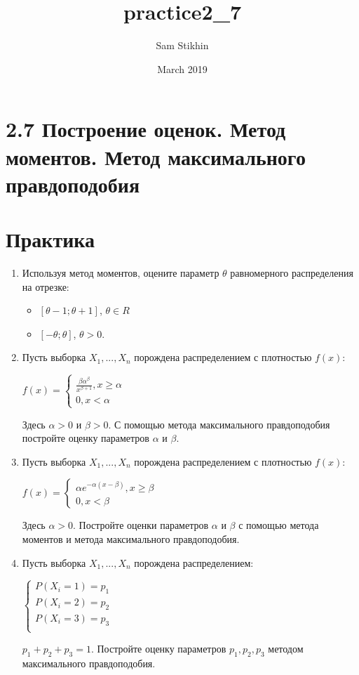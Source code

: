 \documentclass[a4paper, 14pt]{extarticle}
\title{practice2_7}
\author{Sam Stikhin}
\date{March 2019}
\begin{document}
\section*{2.7 Построение оценок. Метод моментов. Метод максимального правдоподобия}
\section{Практика}
\begin{enumerate}
	\item Используя метод моментов, оцените параметр $\theta$ 	равномерного распределения на отрезке:
	\begin{itemize}
		\item $\left[\theta - 1; \theta + 1\right]$, $\theta \in R$
		\item $\left[-\theta; \theta\right]$, $\theta > 0$.
	\end{itemize}
	
	\item Пусть выборка $X_1, ..., X_n$ порождена распределением с плотностью $f(x)$:
	\begin{center}
		$f(x) = \begin{cases}
			\frac{\beta \alpha^{\beta}}{x^{\beta + 1}}, x \ge \alpha\\
			0, x < \alpha
		\end{cases}$
	\end{center}
	Здесь $\alpha > 0$ и $\beta > 0$. С помощью метода максимального правдоподобия постройте оценку параметров $\alpha$ и $\beta$.
	
	\item Пусть выборка $X_1, ..., X_n$ порождена распределением с плотностью $f(x)$:
	\begin{center}
		$f(x) = \begin{cases}
			\alpha e^{-\alpha\left(x - \beta\right)}, x \ge \beta\\
			0, x < \beta
		\end{cases}$
	\end{center}
	Здесь $\alpha > 0$. Постройте оценки параметров $\alpha$ и $\beta$ с помощью метода моментов и метода максимального правдоподобия.
	
	\item Пусть выборка $X_1, ..., X_n$ порождена распределением:
	\begin{center}
		$\begin{cases}
			P(X_i = 1) = p_1\\
			P(X_i = 2) = p_2\\
			P(X_i = 3) = p_3\\
		\end{cases}$
	\end{center}
	$p_1 + p_2 + p_3 = 1$. Постройте оценку параметров $p_1, p_2, p_3$ методом максимального правдоподобия.
\end{enumerate}
\newpage
\end{document}
